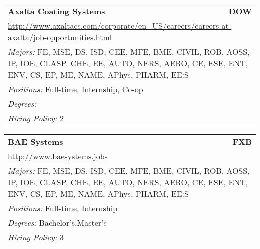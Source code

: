 \documentclass[twoside]{article}
\begin{document}
\begin{center}
\begin{multicols}{3}
\begin{FlushLeft}
\begin{minipage}{\columnwidth}
\end{minipage}
 
\begin{minipage}{\columnwidth}\begin{tabularx}{.95\columnwidth}{Xr}
                 {\Large\bf Axalta Coating Systems} & {\Large\bf DOW}\\
    \multicolumn{2}{p{.95\columnwidth}}{\url{http://www.axaltacs.com/corporate/en_US/careers/careers-at-axalta/job-opportunities.html}}\\
    \multicolumn{2}{p{.95\columnwidth}}{\emph{Majors:} FE, MSE, DS, ISD, CEE, MFE, BME, CIVIL, ROB, AOSS, IP, IOE, CLASP, CHE, EE, AUTO, NERS, AERO, CE, ESE, ENT, ENV, CS, EP, ME, NAME, APhys, PHARM, EE:S}\\
    \multicolumn{2}{p{.95\columnwidth}}{\emph{Positions:} Full-time, Internship, Co-op}\\
    \multicolumn{2}{p{.95\columnwidth}}{\emph{Degrees:} }\\
    \multicolumn{2}{p{.95\columnwidth}}{\emph{Hiring Policy:} 2}\\
    \end{tabularx}
    
\end{minipage}
 
\begin{minipage}{\columnwidth}\begin{tabularx}{.95\columnwidth}{Xr}
                 {\Large\bf BAE Systems} & {\Large\bf FXB}\\
    \multicolumn{2}{p{.95\columnwidth}}{\url{http://www.baesystems.jobs}}\\
    \multicolumn{2}{p{.95\columnwidth}}{\emph{Majors:} FE, MSE, DS, ISD, CEE, MFE, BME, CIVIL, ROB, AOSS, IP, IOE, CLASP, CHE, EE, AUTO, NERS, AERO, CE, ESE, ENT, ENV, CS, EP, ME, NAME, APhys, PHARM, EE:S}\\
    \multicolumn{2}{p{.95\columnwidth}}{\emph{Positions:} Full-time, Internship}\\
    \multicolumn{2}{p{.95\columnwidth}}{\emph{Degrees:} Bachelor's,Master's}\\
    \multicolumn{2}{p{.95\columnwidth}}{\emph{Hiring Policy:} 3}\\
    \end{tabularx}
    
\end{minipage}
 

\end{FlushLeft}
\end{multicols}
\end{center}
\end{document}
